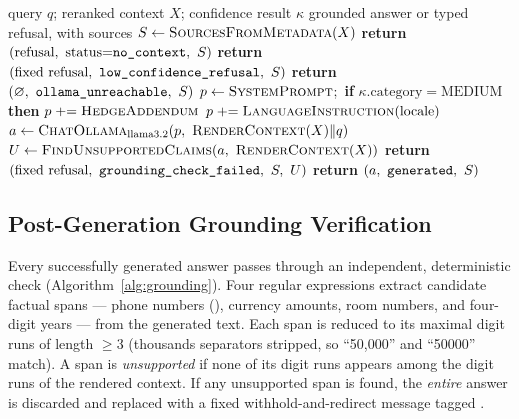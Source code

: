 \begin{algorithm}[!t]
\caption{Confidence-Gated RAG Generation}
\label{alg:gen}
\begin{algorithmic}[1]
\Require query $q$; reranked context $X$; confidence result $\kappa$
\Ensure grounded answer or typed refusal, with sources
\State $S \gets \textsc{SourcesFromMetadata}(X)$
 \textbf{return} $(\text{refusal},\ \text{status}{=}\code{no\_context},\ S)$ \EndIf
{}
  \State \textbf{return} $(\text{fixed refusal},\ \code{low\_confidence\_refusal},\ S)$ 
\EndIf
{} \textbf{return} $(\varnothing,\ \code{ollama\_unreachable},\ S)$ \EndIf
\State $p \gets \textsc{SystemPrompt}$;\ \textbf{if} $\kappa.\text{category}=\text{MEDIUM}$ \textbf{then} $p \mathrel{+}= \textsc{HedgeAddendum}$
\State $p \mathrel{+}= \textsc{LanguageInstruction}(\text{locale})$
\State $a \gets \textsc{ChatOllama}_{\text{llama3.2}}(p,\ \textsc{RenderContext}(X)\Vert q)$ 
\State $U \gets \textsc{FindUnsupportedClaims}(a,\ \textsc{RenderContext}(X))$ 
 \textbf{return} $(\text{fixed refusal},\ \code{grounding\_check\_failed},\ S,\ U)$ \EndIf
\State \textbf{return} $(a,\ \texttt{generated},\ S)$
\end{algorithmic}
\end{algorithm}

\subsection{Post-Generation Grounding Verification}
Every successfully generated answer passes through an independent,
deterministic check (Algorithm~\ref{alg:grounding}). Four regular
expressions extract candidate factual spans --- phone numbers
(),
currency amounts, room numbers, and four-digit years --- from the generated
text. Each span is reduced to its maximal digit runs of length
$\ge 3$ (thousands separators stripped, so ``50,000'' and ``50000'' match).
A span is \emph{unsupported} if none of its digit runs appears among the
digit runs of the rendered context. If any unsupported span is found, the
\emph{entire} answer is discarded and replaced with a fixed
withhold-and-redirect message tagged .

